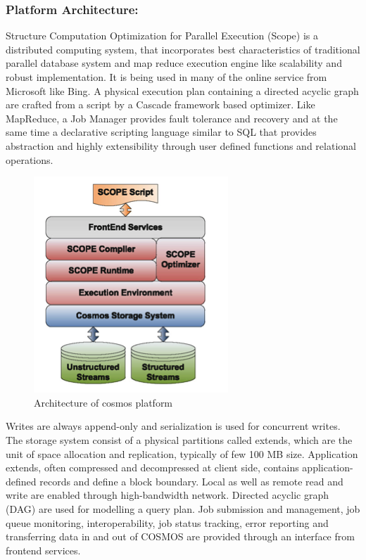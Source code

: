 \documentclass[runningheads,a4paper]{llncs}
\begin{document}
{\subsubsection{Platform Architecture:}Structure Computation Optimization for Parallel Execution (Scope) is a distributed computing system, that incorporates best characteristics of traditional parallel database system and map reduce execution engine like scalability and robust implementation. It is being used in many of the online service from Microsoft like Bing. A physical execution plan containing a directed acyclic graph are crafted from a script by a Cascade framework based optimizer.  Like MapReduce, a Job Manager provides fault tolerance and recovery and at the same time a declarative scripting language similar to SQL that provides abstraction and highly extensibility through user defined functions and relational operations. 

\begin{figure}[!htb]
	\includegraphics[scale=1]{./images/krunal1}
	\centering
	\caption{Architecture of cosmos platform }
	\label{fig:architecture_of_cosmos}
\end{figure}
Writes are always append-only and serialization is used for concurrent writes. The storage system consist of a physical partitions called extends, which are the unit of space allocation and replication, typically of few 100 MB size. Application extends, often compressed and decompressed at client side, contains application-defined records and define a block boundary. Local as well as remote read and write are enabled through high-bandwidth network. Directed acyclic graph (DAG) are used for modelling a query plan. Job submission and management, job queue monitoring, interoperability, job status tracking, error reporting and transferring data in and out of COSMOS are provided through an interface from frontend services.\\


}
\end{document}
